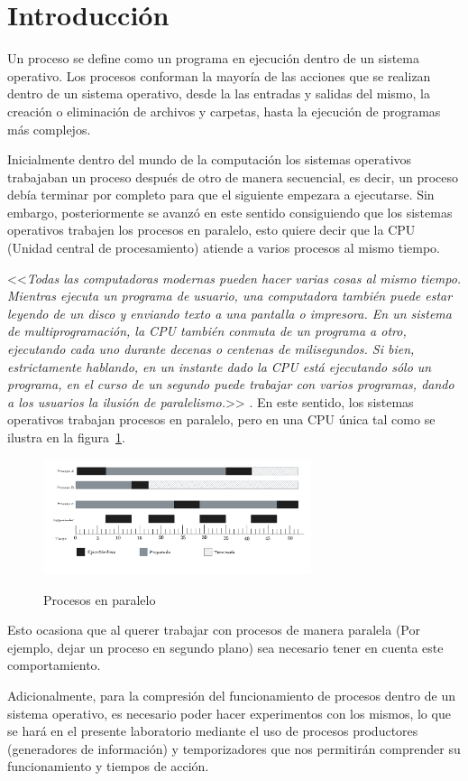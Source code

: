 \section{Introducción}
Un proceso se define como un programa en ejecución dentro de un sistema operativo. Los procesos conforman la mayoría de las acciones que se realizan dentro de un sistema operativo, desde la las entradas y salidas del mismo, la creación o eliminación de archivos y carpetas, hasta la ejecución de programas más complejos.

Inicialmente dentro del mundo de la computación los sistemas operativos trabajaban un proceso después de otro de manera secuencial, es decir, un proceso debía terminar por completo para que el siguiente empezara a ejecutarse. Sin embargo, posteriormente se avanzó en este sentido consiguiendo que los sistemas operativos trabajen los procesos en paralelo, esto quiere decir que la CPU (Unidad central de procesamiento) atiende a varios procesos al mismo tiempo.

<<\textit{Todas las computadoras modernas pueden hacer varias cosas al mismo tiempo. Mientras ejecuta un programa de usuario, una computadora también puede estar leyendo de un disco y enviando texto a una pantalla o impresora. En un sistema de multiprogramación, la CPU también conmuta de un programa a otro, ejecutando cada uno durante decenas o centenas de milisegundos. Si bien, estrictamente hablando, en un instante dado la CPU está ejecutando sólo un programa, en el curso de un segundo puede trabajar con varios programas, dando a los usuarios la ilusión de paralelismo.}>> \parencite{tanenbaum1997sistemas}. En este sentido, los sistemas operativos trabajan procesos en paralelo, pero en una CPU única tal como se ilustra en la figura~\ref{fig:procesosParalelos}.

\begin{figure}[!ht]
    \centering
    \caption{Procesos en paralelo}
    \includegraphics[width=0.7\textwidth]{src/images/Procesos en paralelo.png}\label{fig:procesosParalelos}
\end{figure}

Esto ocasiona que al querer trabajar con procesos de manera paralela (Por ejemplo, dejar un proceso en segundo plano) sea necesario tener en cuenta este comportamiento.

Adicionalmente, para la compresión del funcionamiento de procesos dentro de un sistema operativo, es necesario poder hacer experimentos con los mismos, lo que se hará en el presente laboratorio mediante el uso de procesos productores (generadores de información) y temporizadores que nos permitirán comprender su funcionamiento y tiempos de acción.
